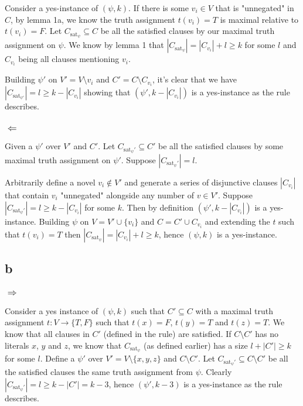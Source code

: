 \documentclass{article}
\begin{document}
Consider a yes-instance of $(\psi, k)$. If there is some $v_i \in V$ that is "unnegated" in $C$, by lemma 1a, we know the truth assignment $t(v_i)=T$ is maximal relative to $t(v_i)=F$. Let $C_{\text{sat}_\psi} \subseteq C$ be all the satisfied clauses by our maximal truth assignment on $\psi$. We know by lemma 1 that $|C_{\text{sat}_\psi}| = |C_{v_i}| + l \geq k$ for some $l$ and $C_{v_i}$ being all clauses mentioning $v_i$.

Building $\psi'$ on $V'=V \setminus {v_i}$ and $C'=C \setminus C_{v_i}$, it's clear that we have $|C_{\text{sat}_{\psi'}}| = l \geq k - |C_{v_i}|$ showing that $(\psi', k - |C_{v_i}|)$ is a yes-instance as the rule describes.

\subsubsection*{$\Leftarrow$}
Given a $\psi'$ over $V'$ and $C'$. Let $C_{\text{sat}_\psi'} \subseteq C'$ be all the satisfied clauses by some maximal truth assignment on $\psi'$. Suppose $|C_{\text{sat}_\psi'}| = l$.

Arbitrarily define a novel $v_i \not\in V'$ and generate a series of disjunctive clauses $|C_{v_i}|$ that contain $v_i$ "unnegated" alongside any number of $v \in V'$. Suppose $|C_{\text{sat}_\psi'}| = l \geq k - |C_{v_i}|$ for some $k$. Then by definition $(\psi', k - |C_{v_i}|)$ is a yes-instance. Building $\psi$ on $V = V' \cup \{v_i\}$ and $C = C' \cup {C_{v_i}}$ and extending the $t$ such that $t(v_i)=T$ then $|C_{\text{sat}_\psi}| = |C_{v_i}| + l \geq k$, hence $(\psi, k)$ is a yes-instance.

\subsection*{b}
\subsubsection*{$\Rightarrow$}
Consider a yes instance of $(\psi, k)$ such that $C' \subseteq C$ with a maximal truth assignment $t: V \rightarrow \{T,F\}$ such that $t(x)=F$, $t(y)=T$ and $t(z)=T$. We know that all clauses in $C'$ (defined in the rule) are satisfied. If $C \setminus C'$ has no literals $x$, $y$ and $z$, we know that $C_{\text{sat}_\psi}$ (as defined earlier) has a size $ l + |C'| \geq k$ for some $l$. Define a $\psi'$ over $V' = V \setminus \{x,y,z\}$ and $C \setminus C'$. Let $C_{\text{sat}_\psi'} \subseteq C\setminus C'$ be all the satisfied clauses the same truth assignment from $\psi$. Clearly $|C_{\text{sat}_\psi'}| = l \geq k - |C'| = k - 3$, hence $(\psi', k - 3)$ is a yes-instance as the rule describes.
\end{document}
